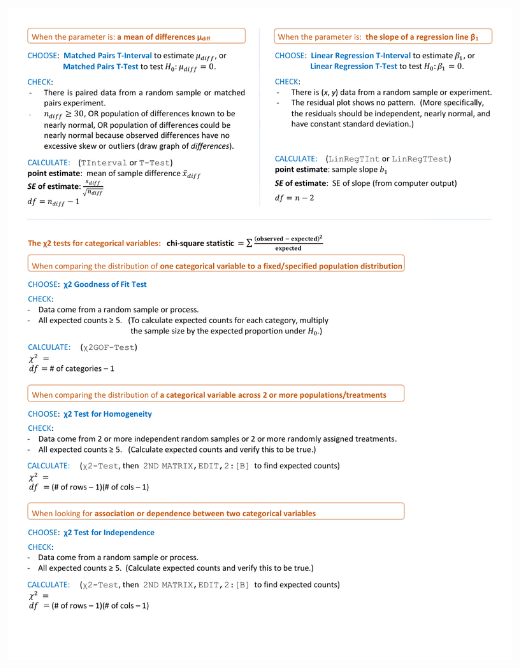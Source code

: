 \begin{center}
\includegraphics[height=10in]{extraTeX/inferenceGuide/figures/inference_guide2}
\end{center}
\label{inferenceGuide}
\restoregeometry
